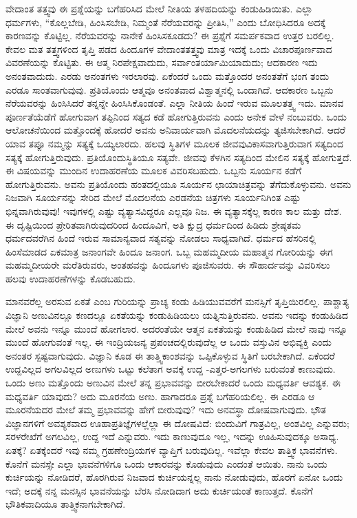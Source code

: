 ವೇದಾಂತ ತತ್ತ್ವವು ಈ ಪ್ರಶ್ನೆಯನ್ನು ಬಗೆಹರಿಸಿದ ಮೇಲೆ ನೀತಿಯ ತಳಹದಿಯನ್ನು ಕಂಡುಹಿಡಿಯಿತು. ಎಲ್ಲಾ ಧರ್ಮಗಳು, “ಕೊಲ್ಲಬೇಡಿ, ಹಿಂಸಿಸಬೇಡಿ, ನಿಮ್ಮಂತೆ ನೆರೆಯವರನ್ನು ಪ್ರೀತಿಸಿ,'' ಎಂದು ಬೋಧಿಸಿದರೂ ಅದಕ್ಕೆ ಕಾರಣವನ್ನು ಕೊಟ್ಟಿಲ್ಲ. ನೆರೆಯವರನ್ನು ನಾನೇಕೆ ಹಿಂಸಿಸಕೂಡದು? ಈ ಪ್ರಶ್ನೆಗೆ ಸಮರ್ಪಕವಾದ ಉತ್ತರ ಬರಲಿಲ್ಲ. ಕೇವಲ ಮತ ತತ್ತ್ವಗಳಿಂದ ತೃಪ್ತಿ ಪಡದ ಹಿಂದೂಗಳ ವೇದಾಂತತತ್ತ್ವವು ಮಾತ್ರ ಇದಕ್ಕೆ ಒಂದು ವಿಚಾರಪೂರ್ಣವಾದ ವಿವರಣೆಯನ್ನು ಕೊಟ್ಟಿತು. ಈ ಆತ್ಮ ನಿರಪೇಕ್ಷವಾದುದು, ಸರ್ವಾಂತರ್ಯಾಮಿಯಾದುದು; ಆದಕಾರಣ ಇದು ಅನಂತವಾದುದು. ಎರಡು ಅನಂತಗಳು ಇರಲಾರವು. ಏಕೆಂದರೆ ಒಂದು ಮತ್ತೊಂದರ ಅನಂತತೆಗೆ ಭಂಗ ತಂದು ಎರಡೂ ಸಾಂತವಾಗುವುವು. ಪ್ರತಿಯೊಂದು ಆತ್ಮವೂ ಅನಂತವಾದ ವಿಶ್ವಾತ್ಮನಲ್ಲಿ ಒಂದಾಗಿದೆ. ಆದಕಾರಣ ಒಬ್ಬನು ನೆರೆಯವರನ್ನು ಹಿಂಸಿಸಿದರೆ ತನ್ನನ್ನೇ ಹಿಂಸಿಸಿಕೊಂಡಂತೆ. ಎಲ್ಲಾ ನೀತಿಯ ಹಿಂದೆ ಇರುವ ಮೂಲತತ್ತ್ವ ಇದು. ಮಾನವ ಪೂರ್ಣತೆಯೆಡೆಗೆ ಹೋಗುವಾಗ ತಪ್ಪಿನಿಂದ ಸತ್ಯದ ಕಡೆ ಹೋಗುತ್ತಿರುವನು ಎಂದು ಅನೇಕ ವೇಳೆ ನಂಬುವರು. ಒಂದು ಆಲೋಚನೆಯಿಂದ ಮತ್ತೊಂದಕ್ಕೆ ಹೋದರೆ ಅವನು ಅನಿವಾರ್ಯವಾಗಿ ಮೊದಲನೆಯದನ್ನು ತ್ಯಜಿಸಬೇಕಾಗಿದೆ. ಆದರೆ ಯಾವ ತಪ್ಪೂ ನಮ್ಮನ್ನು ಸತ್ಯಕ್ಕೆ ಒಯ್ಯಲಾರದು. ಹಲವು ಸ್ಥಿತಿಗಳ ಮೂಲಕ ಜೀವವು\break ವಿಕಾಸವಾಗುತ್ತಿರುವಾಗ ಸತ್ಯದಿಂದ ಸತ್ಯಕ್ಕೆ ಹೋಗುತ್ತಿರುವುದು. ಪ್ರತಿಯೊಂದು\break ಸ್ಥಿತಿಯೂ ಸತ್ಯವೇ. ಜೀವವು ಕೆಳಗಿನ ಸತ್ಯದಿಂದ ಮೇಲಿನ ಸತ್ಯಕ್ಕೆ ಹೋಗುತ್ತದೆ. ಈ ವಿಷಯವನ್ನು ಮುಂದಿನ ಉದಾಹರಣೆಯ ಮೂಲಕ ವಿವರಿಸಬಹುದು. ಒಬ್ಬನು ಸೂರ್ಯನ ಕಡೆಗೆ ಹೋಗುತ್ತಿರುವನು. ಅವನು ಪ್ರತಿಯೊಂದು ಹಂತದಲ್ಲಿಯೂ ಸೂರ್ಯನ ಛಾಯಾಚಿತ್ರವನ್ನು ತೆಗೆದುಕೊಳ್ಳುವನು. ಅವನು ನಿಜವಾಗಿ ಸೂರ್ಯನನ್ನು ಸೇರಿದ ಮೇಲೆ ಮೊದಲನೆಯ ಎರಡನೆಯ ಚಿತ್ರಗಳು ಸೂರ್ಯನಿಗಿಂತ ಎಷ್ಟು ಭಿನ್ನವಾಗಿರುವುವು! ಇವುಗಳಲ್ಲಿ ಎಷ್ಟು ವ್ಯತ್ಯಾಸವಿದ್ದರೂ ಎಲ್ಲವೂ ನಿಜ. ಈ ವ್ಯತ್ಯಾಸಕ್ಕೆಲ್ಲ ಕಾರಣ ಕಾಲ ಮತ್ತು ದೇಶ. ಈ ದೃಷ್ಟಿಯಿಂದ ಪ್ರೇರಿತವಾಗಿರುವುದರಿಂದ ಹಿಂದೂವಿಗೆ, ಅತಿ ಕ್ಷುದ್ರ ಧರ್ಮದಿಂದ ಹಿಡಿದು ಶ್ರೇಷ್ಠತಮ ಧರ್ಮದವರೆಗಿನ ಹಿಂದೆ ಇರುವ ಸಾಮಾನ್ಯವಾದ ಸತ್ಯವನ್ನು ನೋಡಲು ಸಾಧ್ಯವಾಗಿದೆ. ಧರ್ಮದ ಹೆಸರಿನಲ್ಲಿ ಹಿಂಸೆಮಾಡದ ಏಕಮಾತ್ರ ಜನಾಂಗವೇ ಹಿಂದೂ ಜನಾಂಗ. ಒಬ್ಬ ಮಹಮ್ಮದೀಯ ಮಹಾತ್ಮನ ಗೋರಿಯನ್ನು ಈಗ ಮಹಮ್ಮದೀಯರೇ ಮರೆತಿರುವರು, ಅಂತಹವನ್ನು ಹಿಂದೂಗಳು ಪೂಜಿಸುವರು. ಈ ಸೌಹಾರ್ದವನ್ನು ವಿವರಿಸಲು ಹಲವು ಉದಾಹರಣೆಗಳನ್ನು ಕೊಡಬಹುದು.

ಮಾನವರೆಲ್ಲ ಅರಸುವ ಏಕತೆ ಎಂಬ ಗುರಿಯನ್ನು ಪ್ರಾಚ್ಯ ಕಂಡು ಹಿಡಿಯುವವರೆಗೆ ಮನಸ್ಸಿಗೆ ತೃಪ್ತಿಯಿರಲಿಲ್ಲ. ಪಾಶ್ಚಾತ್ಯ ವಿಜ್ಞಾನಿ ಅಣುವಿನಲ್ಲೂ ಕಣದಲ್ಲೂ ಏಕತೆಯನ್ನು ಕಂಡುಹಿಡಿಯಲು ಯತ್ನಿಸುತ್ತಿರುವನು. ಅವನು ಇದನ್ನು ಕಂಡುಹಿಡಿದ ಮೇಲೆ ಅವನು ಇನ್ನೂ ಮುಂದೆ ಹೋಗಲಾರ. ಅದರಂತೆಯೇ ಆತ್ಮನ ಏಕತೆಯನ್ನು ಕಂಡುಹಿಡಿದ ಮೇಲೆ ನಾವು ಇನ್ನೂ ಮುಂದೆ ಹೋಗುವಂತೆ ಇಲ್ಲ. ಈ ಇಂದ್ರಿಯಜನ್ಯ ಪ್ರಪಂಚದಲ್ಲಿರುವುದೆಲ್ಲ ಆ ಒಂದು ವಸ್ತುವಿನ ಅಭಿವ್ಯಕ್ತಿ ಎಂದು ಅನಂತರ ಸ್ಪಷ್ಟವಾಗುವುದು. ವಿಜ್ಞಾನಿ ಕೂಡ ಈ ತಾತ್ತ್ವಿಕಾಂಶವನ್ನು ಒಪ್ಪಿಕೊಳ್ಳುವ ಸ್ಥಿತಿಗೆ ಬರಬೇಕಾಗಿದೆ. ಏಕೆಂದರೆ ಉದ್ದವಿಲ್ಲದ ಅಗಲವಿಲ್ಲದ ಅಣುಗಳು ಒಟ್ಟು ಕಲೆತಾಗ ಅವಕ್ಕೆ ಉದ್ದ -ಎತ್ತರ-ಅಗಲಗಳು ಬರುವಂತೆ ಕಾಣುವುದು. ಒಂದು ಅಣು ಮತ್ತೊಂದು ಅಣುವಿನ ಮೇಲೆ ತನ್ನ ಪ್ರಭಾವವನ್ನು ಬೀರಬೇಕಾದರೆ ಒಂದು ಮಧ್ಯವರ್ತಿ ಆವಶ್ಯಕ. ಈ ಮಧ್ಯವರ್ತಿ ಯಾವುದು? ಅದು ಮೂರನೆಯ ಅಣು. ಹಾಗಾದರೂ ಪ್ರಶ್ನೆ ಬಗೆಹರಿಯಲಿಲ್ಲ. ಈ ಎರಡೂ ಆ ಮೂರನೆಯದರ ಮೇಲೆ ತಮ್ಮ ಪ್ರಭಾವವನ್ನು ಹೇಗೆ ಬೀರುವುವು? ಇದು ಅನವಸ್ಥಾ ದೋಷವಾಗುವುದು. ಭೌತ ವಿಜ್ಞಾನಗಳಿಗೆ ಅವಶ್ಯಕವಾದ ಊಹಾಪ್ರತಿಜ್ಞೆಗಳಲ್ಲೆಲ್ಲಾ ಈ ದೋಷವಿದೆ: ಬಿಂದುವಿಗೆ ಗಾತ್ರವಿಲ್ಲ, ಅಂಶವಿಲ್ಲ ಎನ್ನುವರು; ಸರಳರೇಖೆಗೆ ಅಗಲವಿಲ್ಲ, ಉದ್ದ ಇದೆ ಎನ್ನುವರು. ಇದು ಕಾಣುವುದೂ ಇಲ್ಲ, ಇದನ್ನು ಊಹಿಸುವುದಕ್ಕೂ ಅಸಾಧ್ಯ. ಏತಕ್ಕೆ? ಏತಕ್ಕೆಂದರೆ ಇವು ನಮ್ಮ ಗ್ರಹಣೇಂದ್ರಿಯಗಳ ವ್ಯಾಪ್ತಿಗೆ ಬರುವುದಿಲ್ಲ. ಇವೆಲ್ಲಾ ಕೇವಲ ತಾತ್ತ್ವಿಕ ಭಾವನೆಗಳು. ಕೊನೆಗೆ ಮನಸ್ಸೇ ಎಲ್ಲಾ ಭಾವನೆಗಳಿಗೂ ಒಂದು ಆಕಾರವನ್ನು ಕೊಡುವುದು ಎಂದಂತೆ ಆಯಿತು. ನಾನು ಒಂದು ಕುರ್ಚಿಯನ್ನು ನೋಡಿದರೆ, ಹೊರಗಿರುವ ನಿಜವಾದ ಕುರ್ಚಿಯನ್ನಲ್ಲ ನಾನು ನೋಡುವುದು, ಹೊರಗೆ ಏನೋ ಒಂದು ಇದೆ; ಅದಕ್ಕೆ ನನ್ನ ಮನಸ್ಸಿನ ಭಾವನೆಯನ್ನು ಬೆರಸಿ ನೋಡಿದಾಗ ಅದು ಕುರ್ಚಿಯಂತೆ ಕಾಣುತ್ತದೆ. ಕೊನೆಗೆ ಭೌತಿಕವಾದಿಯೂ ತಾತ್ತ್ವಿಕನಾಗಬೇಕಾಗಿದೆ.


